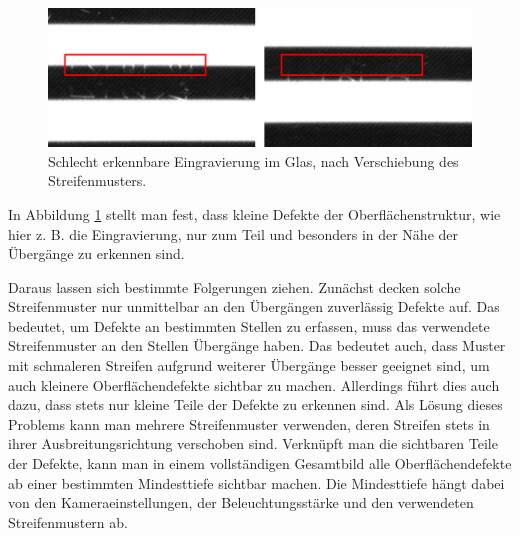 \begin{figure}[H]
	\centering
	\includegraphics[width=\textwidth]{03_sichtpruefungDurchLichtstreuung/verfahren/figures/minorScratch}
	\caption[Eingravierung im Glas]{Schlecht erkennbare Eingravierung im Glas, nach Verschiebung des Streifenmusters.}
	\label{img:engraving}
\end{figure}

\noindent
In Abbildung \ref{img:engraving} stellt man fest, dass kleine Defekte der Oberflächenstruktur, wie hier z. B. die Eingravierung, nur zum Teil und besonders in der Nähe der Übergänge zu erkennen sind.

\p
Daraus lassen sich bestimmte Folgerungen ziehen.
Zunächst decken solche Streifenmuster nur unmittelbar an den Übergängen zuverlässig Defekte auf.
Das bedeutet, um Defekte an bestimmten Stellen zu erfassen, muss das verwendete Streifenmuster an den Stellen Übergänge haben.
Das bedeutet auch, dass Muster mit schmaleren Streifen aufgrund weiterer Übergänge besser geeignet sind, um auch kleinere Oberflächendefekte sichtbar zu machen.
Allerdings führt dies auch dazu, dass stets nur kleine Teile der Defekte zu erkennen sind.
Als Lösung dieses Problems kann man mehrere Streifenmuster verwenden, deren Streifen stets in ihrer Ausbreitungsrichtung verschoben sind.
Verknüpft man die sichtbaren Teile der Defekte, kann man in einem vollständigen Gesamtbild alle Oberflächendefekte ab einer bestimmten Mindesttiefe sichtbar machen.
Die Mindesttiefe hängt dabei von den Kameraeinstellungen, der Beleuchtungsstärke und den verwendeten Streifenmustern ab.